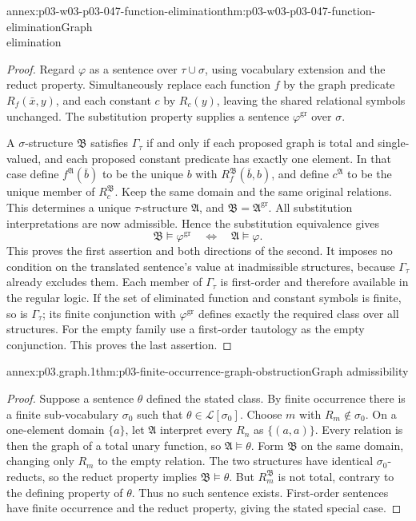 \begin{annexitem}{annex:p03-w03-p03-047-function-elimination}{thm:p03-w03-p03-047-function-elimination}{Graph\\elimination}
\begin{proof}
Regard \(\varphi\) as a sentence over \(\tau\cup\sigma\), using
vocabulary extension and the reduct property. Simultaneously replace
each function \(f\) by the graph predicate \(R_f(\bar x,y)\),
and each constant \(c\) by \(R_c(y)\), leaving the shared relational
symbols unchanged. The substitution property supplies a sentence
\(\varphi^{\mathrm{gr}}\) over \(\sigma\).

A \(\sigma\)-structure \(\mathfrak B\) satisfies \(\Gamma_\tau\)
if and only if each proposed graph is total and single-valued, and
each proposed constant predicate has exactly one element. In that
case define \(f^{\mathfrak A}(\bar b)\) to be the unique \(b\)
with \(R_f^{\mathfrak B}(\bar b,b)\), and define
\(c^{\mathfrak A}\) to be the unique member of
\(R_c^{\mathfrak B}\). Keep the same domain and the same original
relations. This determines a unique \(\tau\)-structure
\(\mathfrak A\), and \(\mathfrak B=\mathfrak A^{\mathrm{gr}}\).
All substitution interpretations are now admissible. Hence the
substitution equivalence gives
\[
 \mathfrak B\models\varphi^{\mathrm{gr}}
 \quad\Longleftrightarrow\quad
 \mathfrak A\models\varphi.
\]
This proves the first assertion and both directions of the second.
It imposes no condition on the translated sentence's value at
inadmissible structures, because \(\Gamma_\tau\) already excludes them.
Each member of \(\Gamma_\tau\) is first-order and therefore available
in the regular logic. If the set of eliminated function and constant
symbols is finite, so is \(\Gamma_\tau\); its finite conjunction
with \(\varphi^{\mathrm{gr}}\) defines exactly the required class
over all structures. For the empty family use a first-order tautology
as the empty conjunction. This proves the last assertion.
\end{proof}
\end{annexitem}

\begin{annexitem}{annex:p03.graph.1}{thm:p03-finite-occurrence-graph-obstruction}{Graph admissibility}
\label{annex:p03.finite-occurrence-graph-obstruction}
\begin{proof}
Suppose a sentence \(\theta\) defined the stated class. By finite
occurrence there is a finite sub-vocabulary \(\sigma_0\) such that
\(\theta\in\mathscr L[\sigma_0]\). Choose \(m\) with
\(R_m\notin\sigma_0\). On a one-element domain \(\{a\}\), let
\(\mathfrak A\) interpret every \(R_n\) as \(\{(a,a)\}\).
Every relation is then the graph of a total unary function, so
\(\mathfrak A\models\theta\). Form \(\mathfrak B\) on the same
domain, changing only \(R_m\) to the empty relation.
The two structures have identical \(\sigma_0\)-reducts, so the reduct
property implies \(\mathfrak B\models\theta\). But \(R_m^{\mathfrak B}\)
is not total, contrary to the defining property of \(\theta\).
Thus no such sentence exists. First-order sentences have finite
occurrence and the reduct property, giving the stated special case.
\end{proof}
\end{annexitem}

